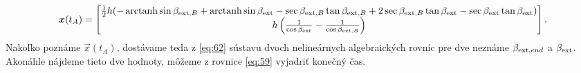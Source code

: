 \documentclass[reqno, a4paper]{amsart}
\numberwithin{equation}{section}
\begin{document}
\begin{align}
 \label{eq:62}
\bm{x}(t_{A})
=
\begin{bmatrix}
    \frac{1}{2}h(-\operatorname{arctanh} \sin 	       \beta_{\mathrm{ext},B} + \operatorname{arctanh} \sin \beta_{\mathrm{ext}} - \sec \beta_{\mathrm{ext},B} \tan \beta_{\mathrm{ext},B} + 2\sec \beta_{\mathrm{ext},B} \tan \beta_{\mathrm{ext}} - \sec \beta_{\mathrm{ext}} \tan \beta_{\mathrm{ext}}) \\
    h\left(\frac{1}{\cos \beta_{\mathrm{ext}}}-\frac{1}{\cos \beta_{\mathrm{ext},B}}\right)
  \end{bmatrix}.
\end{align}
Nakoľko poznáme $\vec{x}(t_{A})$, dostávame teda z \ref{eq:62} sústavu dvoch nelineárnych algebraických rovníc pre dve neznáme $\beta_{\mathrm{ext},end}$ a $\beta_{\mathrm{ext}}$. Akonáhle nájdeme tieto dve hodnoty, môžeme z rovnice \ref{eq:59} vyjadriť konečný čas.
\end{document}
